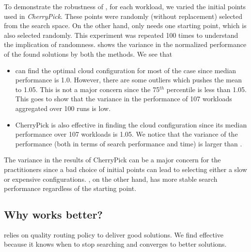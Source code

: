 To demonstrate the robustness of \scout, for each workload, we varied the initial points used in \emph{CherryPick}.
These points were randomly (without replacement) selected from the search space. On the other hand, \scout only needs one starting point, which is also selected randomly. This experiment was repeated 100 times to understand the implication of randomness.
\myfigure{\ref{fig:single_fragility}} shows the variance in the normalized performance of the found solutions by both the methods.
We see that 

\begin{itemize}[leftmargin=*]
    \item \scout can find the optimal cloud configuration for most of the case since median performance is 1.0. However, there are some outliers which pushes the mean to 1.05. This is not a major concern since the 75$^{th}$ percentile is less than 1.05. This goes to show that the variance in the performance of 107 workloads aggregated over 100 runs is low.
    \item CherryPick is also effective in finding the cloud configuration since its median performance over 107 workloads is 1.05. We notice that the variance of the performance (both in terms of search performance and time) is larger than \scout. 
\end{itemize}


The variance in the results of CherryPick can be a major concern for the practitioners since a bad choice of initial points can lead to selecting either a slow or expensive configurations.
\scout, on the other hand, has more stable search performance regardless of the starting point.


\subsection{Why \scout works better?}
\label{sec:why_better}

\scout relies on quality routing policy to deliver good solutions.
We find \scout effective because
it knows when to stop searching and
converges to better solutions.

